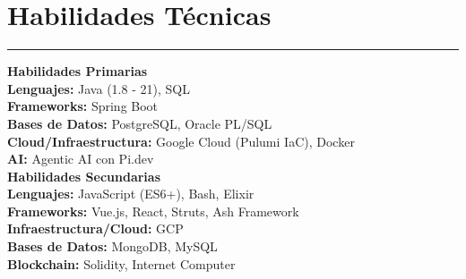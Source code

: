 \documentclass[11pt,a4paper]{article}
\begin{document}
\section*{Habilidades Técnicas}
\hrule
\vspace{5pt}
\textbf{Habilidades Primarias} \\[6pt]
\textbf{Lenguajes:} Java (1.8 - 21), SQL \\
\textbf{Frameworks:} Spring Boot \\
\textbf{Bases de Datos:} PostgreSQL, Oracle PL/SQL \\
\textbf{Cloud/Infraestructura:} Google Cloud (Pulumi IaC), Docker \\
\textbf{AI:} Agentic AI con Pi.dev \\[6pt]
\textbf{Habilidades Secundarias} \\[6pt]
\textbf{Lenguajes:} JavaScript (ES6+), Bash, Elixir \\
\textbf{Frameworks:} Vue.js, React, Struts, Ash Framework \\
\textbf{Infraestructura/Cloud:} GCP \\
\textbf{Bases de Datos:} MongoDB, MySQL \\
\textbf{Blockchain:} Solidity, Internet Computer
\end{document}
